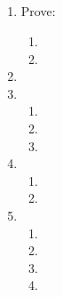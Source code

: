 \documentclass{article}
\title{
    \textmd{\bd{\hmwkClass:\ \hmwkTitle}}\\
}
\author{\hmwkAuthorName}
\begin{document}
\maketitle
\thispagestyle{firststyle}

\begin{enumerate}
    \item Prove:
          \begin{enumerate}
              \item 
                    \pagebreak
              \item 
          \end{enumerate}

          \pagebreak

    \item 

          \pagebreak

    \item
          \begin{enumerate}
              \item 
              \item 
              \item 
          \end{enumerate}

          \pagebreak

    \item
          \begin{enumerate}
              \item 
              \item 
          \end{enumerate}

          \pagebreak

    \item
          \begin{enumerate}
              \item 
              \item 
              \item 
              \item 
          \end{enumerate}

\end{enumerate}
\end{document}

